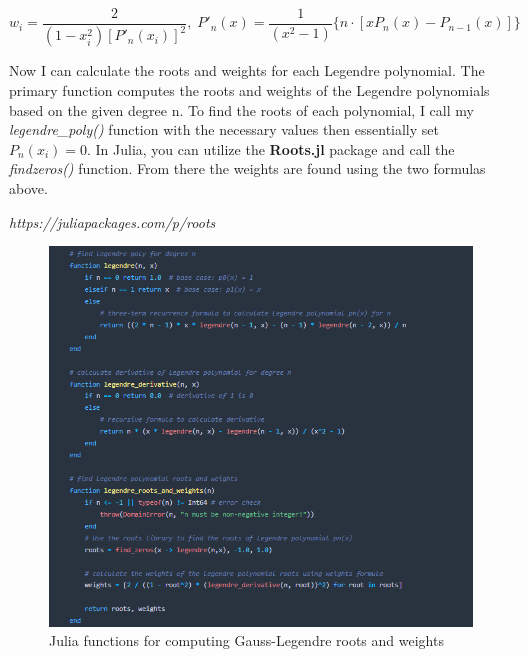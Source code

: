 \documentclass[twoside]{article}
\begin{document}
\[ w_i = \frac{2}{(1 - x_i^2) [P'_n(x_i)]^2}, \; P'_n(x) = \frac{1}{(x^2 -1)} \{n\cdot [xP_n(x) - P_{n-1}(x)]\}\]



Now  I can calculate the roots and weights for each Legendre polynomial. The primary function computes the roots and weights of the Legendre polynomials based on the given degree n. To find the roots of each polynomial, I call my \textit{legendre\_poly()} function with the necessary values then essentially set \(P_n(x_i) = 0\). In Julia, you can utilize the \textbf{Roots.jl} package and call the \textit{findzeros()} function. From there the weights are found using the two formulas above.

\textit{https://juliapackages.com/p/roots}

\begin{figure}[ht]
\centering
\includegraphics[scale=0.85]{img/functions.png}
\caption{Julia functions for computing Gauss-Legendre roots and weights}
\end{figure}
\end{document}
